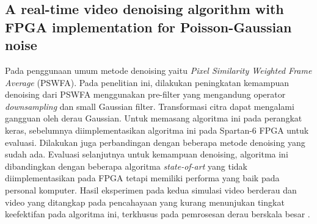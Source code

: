 \subsection{A real-time video denoising algorithm with FPGA implementation for Poisson-Gaussian noise}
Pada penggunaan umum metode denoising yaitu \textit{Pixel Similarity Weighted Frame Average} (PSWFA). Pada penelitian ini, dilakukan peningkatan kemampuan denoising dari PSWFA menggunakan pre-filter yang mengandung operator \textit{downsampling} dan small Gaussian filter. Transformasi citra dapat mengalami gangguan oleh derau Gaussian. Untuk memasang algoritma ini pada perangkat keras, sebelumnya diimplementasikan algoritma ini pada Spartan-6 FPGA untuk evaluasi. Dilakukan juga perbandingan dengan beberapa metode denoising yang sudah ada. Evaluasi selanjutnya untuk kemampuan denoising, algoritma ini dibandingkan dengan beberapa algoritma \textit{state-of-art} yang tidak diimplementasikan pada FPGA tetapi memiliki performa yang baik pada personal komputer. Hasil eksperimen pada kedua simulasi video berderau dan video yang ditangkap pada pencahayaan yang kurang menunjukan tingkat keefektifan pada algoritma ini, terkhusus pada pemrosesan derau berskala besar \cite{soa:xin}.
